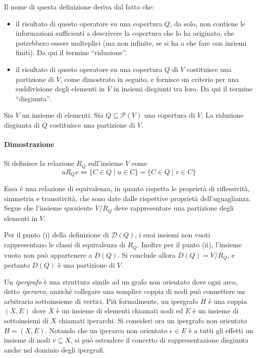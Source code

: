 Il nome di questa definizione deriva dal fatto che:
\begin{itemize}
    \item il risultato di questo operatore su una copertura $Q$, da solo, non contiene le informazioni sufficienti a
        descrivere la copertura che lo ha originato, che potrebbero essere molteplici (ma non infinite, se si ha a che
        fare con insiemi finiti). %
        Da qui il termine ``riduzione''.
    \item il risultato di questo operatore su una copertura $Q$ di $V$ costituisce una partizione di $V$, come
        dimostrato in seguito, e fornisce un criterio per una suddivisione degli elementi in $V$ in insiemi disgiunti
        tra loro.
        Da qui il termine ``disgiunta''.
\end{itemize}

\newpage

\begin{proposition}
Sia $V$ un insieme di elementi. Sia $Q \subseteq \mathcal{P}(V)$ una copertura di $V$.
La riduzione disgiunta di $Q$ costituisce una partizione di $V$.
\end{proposition}

\paragraph{Dimostrazione}
Si definisce la relazione $R_Q$ sull'insieme $V$ come
\begin{equation*}
    uR_{Q}v \Leftrightarrow \{C \in Q \mid u \in C\} = \{C \in Q \mid v \in C\}
\end{equation*}

Essa \`e una relazione di equivalenza, in quanto rispetta le propriet\`a di riflessivit\`a, simmetria e transitivit\`a,
che sono date dalle rispettive propriet\`a dell'uguaglianza.
Segue che l'insieme quoziente $V/R_{Q}$ deve rappresentare una partizione degli elementi in $V$.

Per il punto (i) della definizione di $\mathcal{D}(Q)$, i suoi insiemi non vuoti rappresentano le classi di equivalenza
di $R_Q$.
Inoltre per il punto (ii), l'insieme vuoto non pu\`o appartenere a $D(Q)$.
Si conclude allora $D(Q) = V/R_{Q}$, e pertanto $D(Q)$ \`e una partizione di $V$.


Un \textit{ipergrafo} è una struttura simile ad un grafo non orientato dove ogni arco, detto \textit{iperarco},
anziché collegare una semplice coppia di nodi può connettere un arbitrario sottoinsieme di vertici.
Più formalmente, un ipergrafo $H$ è una coppia $(X, E)$ dove $X$ è un insieme di elementi chiamati nodi ed $E$ è
un insieme di sottoinsiemi di $X$ chiamati iperarchi.
Si consideri ora un ipergrafo non orientato $H = (X, E)$.
Notando che un iperarco non orientato $e \in E$ è a tutti gli effetti un insieme di nodi $v \subseteq X$,
si pu\`o estendere il concetto di rappresentazione disgiunta anche nel dominio degli ipergrafi.

